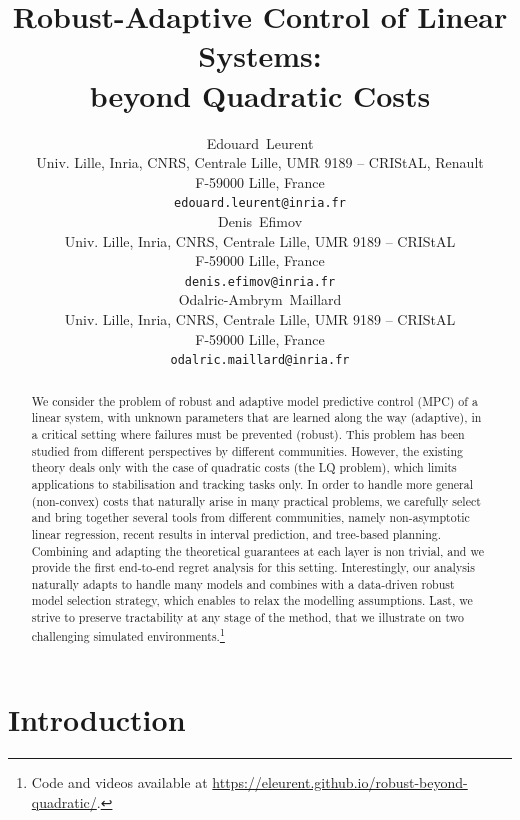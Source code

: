 \documentclass{article}
\title{Robust-Adaptive Control of Linear Systems:\\ beyond Quadratic Costs}
\author{%
	Edouard~Leurent \\
	Univ. Lille, Inria, CNRS, Centrale Lille, UMR 9189 – CRIStAL, Renault\\
	F-59000 Lille, France\\
	\texttt{edouard.leurent@inria.fr} \\
	 \And
	 Denis~Efimov \\
	 Univ. Lille, Inria, CNRS, Centrale Lille, UMR 9189 – CRIStAL\\
	 F-59000 Lille, France\\
	 \texttt{denis.efimov@inria.fr} \\
	 \And
	 Odalric-Ambrym~Maillard \\
	 Univ. Lille, Inria, CNRS, Centrale Lille, UMR 9189 – CRIStAL\\
	 F-59000 Lille, France\\
	 \texttt{odalric.maillard@inria.fr} \\
}
\begin{document}
	
\maketitle

\begin{abstract}
We consider the problem of robust and adaptive model predictive control (MPC) of a linear system, with unknown parameters that are learned along the way (adaptive), in a critical setting where failures must be prevented (robust). This problem has been studied from different perspectives by different communities. However, the existing theory deals only with the case of quadratic costs (the LQ problem), which limits applications to stabilisation and tracking tasks only. In order to handle more general (non-convex) costs that naturally arise in many practical problems, we carefully select and bring together several tools from different communities, namely non-asymptotic linear regression, recent results in interval prediction, and tree-based planning. Combining and adapting the theoretical guarantees at each layer is non trivial, and we provide the first end-to-end regret analysis for this setting. Interestingly, our analysis naturally adapts to handle many models and combines with a data-driven robust model selection strategy, which enables to relax the modelling assumptions. Last, we strive to preserve tractability at any stage of the method, that we illustrate on two challenging simulated environments.\footnote{Code and videos available at  \url{https://eleurent.github.io/robust-beyond-quadratic/}.}
\end{abstract}	




\section{Introduction}
\end{document}
